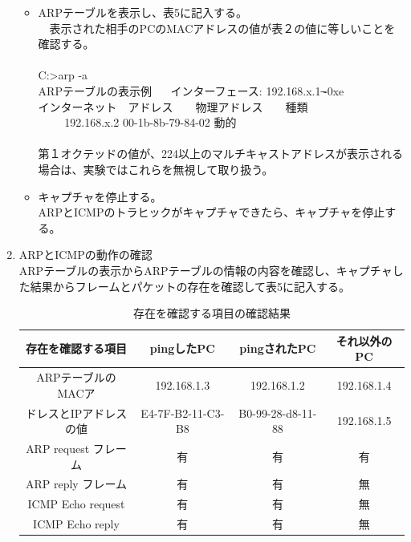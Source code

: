 \documentclass[10pt]{article}
\begin{document}
\begin{enumerate}
\begin{itemize}
        
            \item ARPテーブルを表示し、表5に記入する。\\ 　表示された相手のPCのMACアドレスの値が表２の値に等しいことを確認する。\\\\
                     C:>arp -a \\
                        ARPテーブルの表示例 　
                        インターフェース: 192.168.x.1 ̶-0xe \\ 
                        インターネット　アドレス　　物理アドレス　　種類\\ 　　
                        192.168.x.2 \hspace{1cm} 00-1b-8b-79-84-02\hspace{0.3cm}   動的 \\\\
             \text{*}第１オクテッドの値が、224以上のマルチキャストアドレスが表示される場合は、実験ではこれらを無視して取り扱う。
             \pagebreak
             \item キャプチャを停止する。\\
             ARPとICMPのトラヒックがキャプチャできたら、キャプチャを停止する。
         \end{itemize}
    \item ARPとICMPの動作の確認 \\
        ARPテーブルの表示からARPテーブルの情報の内容を確認し、キャプチャした結果からフレームとパケットの存在を確認して表5に記入する。
        
        \begingroup
        \setlength{\tabcolsep}{5pt} %
        \renewcommand{\arraystretch}{1.5} %
        \begin{table}[H]
        \centering
    	\caption{存在を確認する項目の確認結果}
    	\begin{tabular}{|c|c|c|c|} 
    	\hline
    	    存在を確認する項目 & pingしたPC & pingされたPC & それ以外のPC \\
    	    \hline\hline
    	    ARPテーブルのMACア &  192.168.1.3  & 192.168.1.2 & 192.168.1.4\\
    	    ドレスとIPアドレスの値 & E4-7F-B2-11-C3-B8 & B0-99-28-d8-11-88 & 192.168.1.5\\ [0.5ex] 
    		\hline
    			ARP request フレーム & 有 & 有 & 有 \\ \hline
    			ARP reply フレーム & 有 & 有 & 無 \\ \hline
    			ICMP Echo request & 有 & 有 & 無 \\ \hline
            	ICMP Echo reply & 有 & 有 & 無 \\ \hline
                

\end{tabular}
\end{table}
\end{enumerate}
\end{document}
